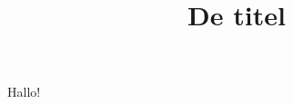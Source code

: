 \documentclass[a4paper]{article}
\title{De titel}
\begin{document}
    \maketitle

    Hallo!
\end{document}
